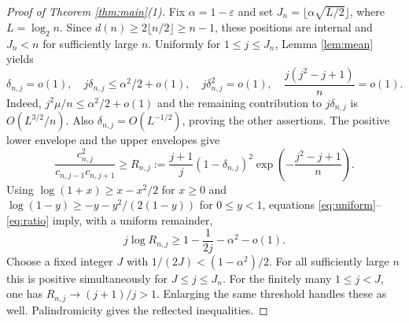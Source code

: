 \documentclass[11pt]{article}
\begin{document}
\begin{proof}[Proof of Theorem \ref{thm:main}(1)]
Fix $\alpha=1-\varepsilon$ and set
$J_n=\lfloor\alpha\sqrt{L/2}\rfloor$, where $L=\log_2n$.
Since $d(n)\ge2\lfloor n/2\rfloor\ge n-1$, these positions are internal
and $J_n<n$ for sufficiently large $n$.
Uniformly for $1\le j\le J_n$, Lemma \ref{lem:mean} yields
\begin{equation}\label{eq:uniform}
 \delta_{n,j}=o(1),\quad
 j\delta_{n,j}\le\alpha^2/2+o(1),\quad
 j\delta_{n,j}^2=o(1),\quad
 \frac{j(j^2-j+1)}n=o(1).
\end{equation}
Indeed, $j^2\mu/n\le\alpha^2/2+o(1)$ and the remaining contribution to
$j\delta_{n,j}$ is $O(L^{3/2}/n)$. Also
$\delta_{n,j}=O(L^{-1/2})$, proving the other assertions.
The positive lower envelope and the upper envelopes give
\begin{equation}\label{eq:ratio}
 \frac{c_{n,j}^2}{c_{n,j-1}c_{n,j+1}}
 \ge R_{n,j}:=\frac{j+1}{j}(1-\delta_{n,j})^2
 \exp\left(-\frac{j^2-j+1}{n}\right).
\end{equation}
Using
$\log(1+x)\ge x-x^2/2$ for $x\ge0$ and
$\log(1-y)\ge-y-y^2/(2(1-y))$ for $0\le y<1$, equations
\eqref{eq:uniform}--\eqref{eq:ratio} imply, with a uniform remainder,
\[
 j\log R_{n,j}\ge1-\frac1{2j}-\alpha^2-o(1).
\]
Choose a fixed integer $J$ with $1/(2J)<(1-\alpha^2)/2$.
For all sufficiently large $n$ this is positive simultaneously for
$J\le j\le J_n$. For the finitely many $1\le j<J$, one has
$R_{n,j}\to(j+1)/j>1$. Enlarging the same threshold handles these as well.
Palindromicity gives the reflected inequalities.
\end{proof}
\end{document}
